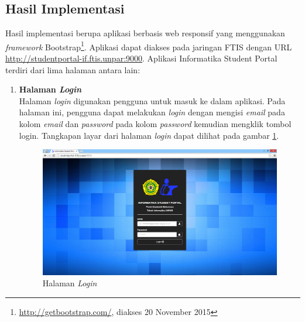 \subsection{Hasil Implementasi}
				Hasil implementasi berupa aplikasi berbasis web responsif yang menggunakan \textit{framework} Bootstrap\footnote{\url{http://getbootstrap.com/}, diakses 20 November 2015}. Aplikasi dapat diakses pada jaringan FTIS dengan URL \url{http://studentportal-if.ftis.unpar:9000}. Aplikasi Informatika Student Portal terdiri dari lima halaman antara lain:
			\begin{enumerate}	 
				\item\textbf{Halaman \textit{Login}}\\
				Halaman \textit{login} digunakan pengguna untuk masuk ke dalam aplikasi. Pada halaman ini, pengguna dapat melakukan \textit{login} dengan mengisi \textit{email} pada kolom \textit{email} dan \textit{password} pada kolom \textit{password} kemudian mengklik tombol login. Tangkapan layar dari halaman \textit{login} dapat dilihat pada gambar \ref{fig:5_hasil_login}.
					\begin{figure}[H]
						\centering
						\includegraphics[scale=0.34]{Gambar/hasil_login}
						\caption{Halaman \textit{Login}} 
						\label{fig:5_hasil_login}
					\end{figure}
					

\end{enumerate}
